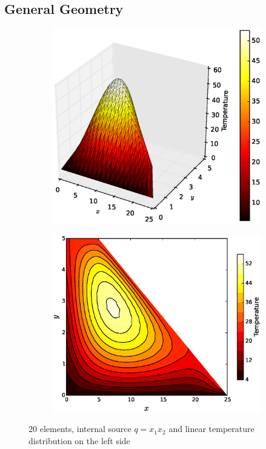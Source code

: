 \documentclass[10pt, a4paper]{article}
\begin{document}
\subsection{General Geometry}

\begin{figure}[H]
\centering
	\begin{subfigure}[H]{0.5\textwidth}
		\includegraphics[width=1.2\textwidth]{fig/figure_7.eps}
		\caption{}
		\label{fig:1}
	\end{subfigure}
	\begin{subfigure}[H]{0.3\textwidth}
		\includegraphics[width=\textwidth]{fig/figure_7.1.eps}
		\caption{}
		\label{fig:2}
	\end{subfigure}
	\caption{20 elements, internal source $q=x_1 x_2$ and linear temperature distribution on the left side}
	\label{fig:3_1}
\end{figure}
\end{document}
